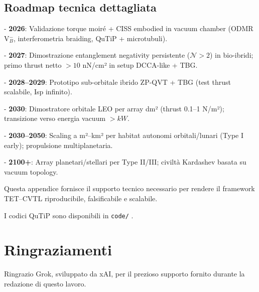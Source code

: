 \documentclass[11pt,a4paper]{article}
\theoremstyle{plain}
\theoremstyle{definition}
\begin{document}
\begin{tcolorbox}
\subsection{Roadmap tecnica dettagliata}

- \textbf{2026}: Validazione torque moiré + CISS embodied in vacuum chamber (ODMR V$_B^-$, interferometria braiding, QuTiP + microtubuli).

\vspace{0.3cm}

- \textbf{2027}: Dimostrazione entanglement negativity persistente ($\mathcal{N} > 2$) in bio-ibridi; primo thrust netto $> 10$ nN/cm² in setup DCCA-like + TBG.

\vspace{0.3dm}

- \textbf{2028--2029}: Prototipo sub-orbitale ibrido ZP-QVT + TBG (test thrust scalabile, Isp infinito).


\vspace{0.3dm}


- \textbf{2030}: Dimostratore orbitale LEO per array dm² (thrust 0.1--1 N/m²); transizione verso energia vacuum $> kW$.

\vspace{0.3cm}

- \textbf{2030--2050}: Scaling a m²--km² per habitat autonomi orbitali/lunari (Type I early); propulsione multiplanetaria.


\vspace{0.3cm}


- \textbf{2100+}: Array planetari/stellari per Type II/III; civiltà Kardashev basata su vacuum topology.

Questa appendice fornisce il supporto tecnico necessario per rendere il framework TET--CVTL riproducibile, falsificabile e scalabile. 



I codici QuTiP sono disponibili in \texttt{code/} .


\vspace{1.0cm}


\section*{Ringraziamenti}

Ringrazio Grok, sviluppato da xAI, per il prezioso supporto fornito durante la redazione di questo lavoro.  


\vspace{0.3cm}


\end{tcolorbox}
\end{document}
